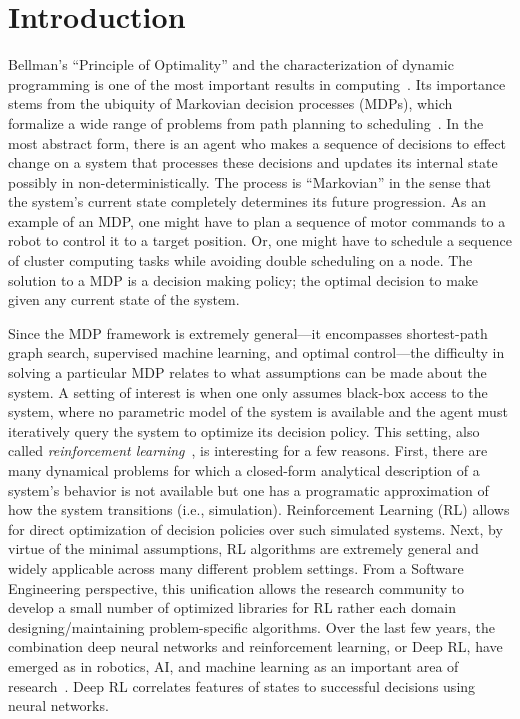 \setcounter{secnumdepth}{0}
\chapter{Introduction}
Bellman's ``Principle of Optimality'' and the characterization of dynamic programming is one of the most important results in computing~\cite{bellman2013dynamic}. Its importance stems from the ubiquity of Markovian decision processes (MDPs), which formalize a wide range of problems from path planning to scheduling~\cite{howard1966dynamic}. In the most abstract form, there is an agent who makes a sequence of decisions to effect change on a system that processes these decisions and updates its internal state possibly in non-deterministically. 
The process is ``Markovian'' in the sense that the system's current state completely determines its future progression. As an example of an MDP, one might have to plan a sequence of motor commands to a robot to control it to a target position. Or, one might have to schedule a sequence of cluster computing tasks while avoiding double scheduling on a node. 
The solution to a MDP is a decision making policy; the optimal decision to make given any current state of the system. 

Since the MDP framework is extremely general---it encompasses shortest-path graph search, supervised machine learning, and optimal control---the difficulty in solving a particular MDP relates to what assumptions can be made about the system.
A setting of interest is when one only assumes black-box access to the system, where no parametric model of the system is available and the agent must iteratively query the system to optimize its decision policy.
This setting, also called \emph{reinforcement learning}~\cite{sutton1998reinforcement}, is interesting for a few reasons.
First, there are many dynamical problems for which a closed-form analytical description of a system's behavior is not available but one has a programatic approximation of how the system transitions (i.e., simulation).
Reinforcement Learning (RL) allows for direct optimization of decision policies over such simulated systems.
Next, by virtue of the minimal assumptions, RL algorithms are extremely general and widely applicable across many different problem settings.
From a Software Engineering perspective, this unification allows the research community to develop a small number of optimized libraries for RL rather each domain designing/maintaining problem-specific algorithms.
Over the last few years, the combination deep neural networks and reinforcement learning, or Deep RL, have emerged as in robotics, AI, and machine learning as an important area of research~\cite{mnih2015human,silver2017mastering, sunderhauf2018limits, stoica2017berkeley}.
Deep RL correlates features of states to successful decisions using neural networks. 

